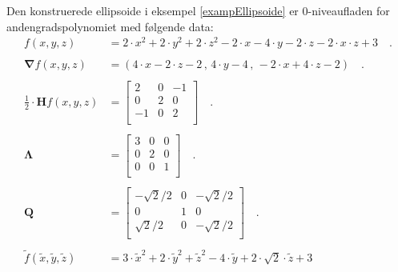 \begin{example}[Ellipsoidedata] \label{exampFunkEll}
Den konstruerede ellipsoide i eksempel \ref{exampEllipsoide} er $0$-niveaufladen for andengradspolynomiet med følgende data:
\begin{equation}
\begin{aligned}
f(x,y, z) &=  2\cdot x^{2} + 2\cdot y^{2} + 2\cdot z^{2} - 2\cdot x - 4\cdot y - 2 \cdot z - 2\cdot x \cdot z + 3\quad . \\   \\
\bm{\nabla}f(x,y,z) &= ( 4\cdot x - 2\cdot z -2\, , \, 4\cdot y - 4 \, , \, -2\cdot x + 4 \cdot z - 2  ) \quad . \\  \\
\frac{1}{2}\cdot \mathbf{H}f(x,y,z) &= \left[
                     \begin{array}{ccc}
                       2 & 0 & -1\\
                       0 & 2 & 0 \\
                       -1 & 0 & 2\\
                     \end{array}
                   \right] \quad . \\  \\
\bm{\Lambda} &= \left[
                     \begin{array}{ccc}
                       3 & 0 & 0 \\
                       0 & 2 & 0 \\
                       0 & 0 & 1 \\
                     \end{array}
                   \right] \quad . \\  \\
\mathbf{Q} &= \left[
                     \begin{array}{ccc}
                       - \sqrt{2}/2 & 0 & - \sqrt{2}/2 \\
                     0& 1& 0\\
                      \sqrt{2}/2 &0 & - \sqrt{2}/2\\
                     \end{array}
                   \right]\quad . \\  \\
\widetilde{f}(\widetilde{x}, \widetilde{y}, \widetilde{z}) & = 3\cdot \widetilde{x}^{2} + 2\cdot \widetilde{y}^{2} + \widetilde{z}^{2}  -4\cdot \widetilde{y}+  2\cdot\sqrt{2}\cdot \widetilde{z} +3 \\

\end{aligned}
\end{equation}
\end{example}
